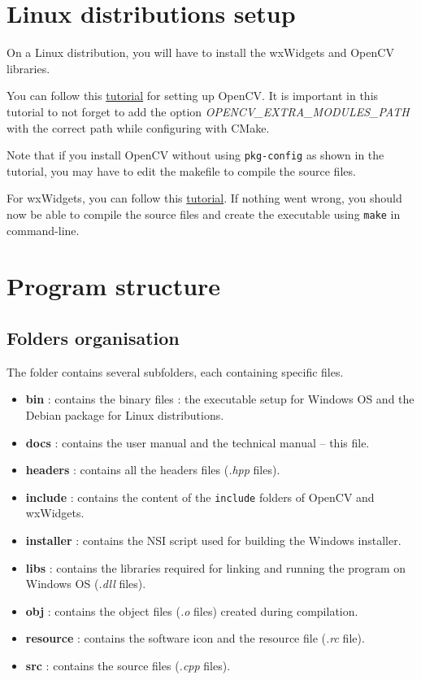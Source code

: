 \documentclass{article}
\begin{document}
\section{Linux distributions setup}

On a Linux distribution, you will have to install the wxWidgets and OpenCV libraries.\bigskip

You can follow this \href{https://docs.opencv.org/3.4/d7/d9f/tutorial_linux_install.html}{tutorial} for setting up OpenCV. It is important in this tutorial to not forget to add the option \textit{OPENCV\_EXTRA\_MODULES\_PATH} with the correct path while configuring with CMake.


Note that if you install OpenCV without using \texttt{pkg-config} as shown in the tutorial, you may have to edit the makefile to compile the source files.\bigskip


For wxWidgets, you can follow this \href{https://www.binarytides.com/install-wxwidgets-ubuntu/}{tutorial}. If nothing went wrong, you should now be able to compile the source files and create the executable using \texttt{make} in command-line.

\section{Program structure}

\subsection{Folders organisation}

The folder contains several subfolders, each containing specific files.

\begin{itemize}
    \item \textbf{bin} : contains the binary files : the executable setup for Windows OS and the Debian package for Linux distributions.
    \item \textbf{docs} : contains the user manual and the technical manual -- this file.
    \item \textbf{headers} : contains all the headers files (\textit{.hpp} files).
    \item \textbf{include} : contains the content of the \texttt{include} folders of OpenCV and wxWidgets.
    \item \textbf{installer} : contains the NSI script used for building the Windows installer.
    \item \textbf{libs} : contains the libraries required for linking and running the program on Windows OS (\textit{.dll} files).
    \item \textbf{obj} : contains the object files (\textit{.o} files) created during compilation.
    \item \textbf{resource} : contains the software icon and the resource file (\textit{.rc} file).
    \item \textbf{src} : contains the source files (\textit{.cpp} files). 
\end{itemize}
\end{document}
